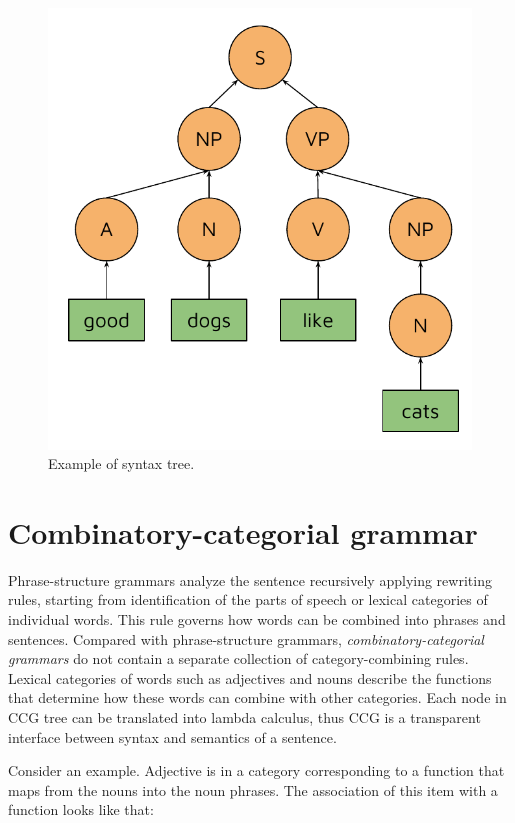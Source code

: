 \begin{figure}
\centering
\includegraphics{Figures/syntaxtree}
\decoRule
\caption[Syntax tree]{Example of syntax tree.}
\label{fig:syntax_tree}
\end{figure}

\section{Combinatory-categorial grammar}
Phrase-structure grammars analyze the sentence recursively applying rewriting rules, starting from identification of the parts of speech or lexical categories of individual words. This rule governs how words can be combined into phrases and sentences. Compared with phrase-structure grammars, \emph{combinatory-categorial grammars} do not contain a separate collection of category-combining rules. Lexical categories of words such as adjectives and nouns describe the functions that determine how these words can combine with other categories. Each node in CCG tree can be translated into lambda calculus, thus CCG is a transparent interface between syntax and semantics of a sentence.

Consider an example. Adjective  is in a category corresponding to a function that maps from the nouns into the noun phrases. The association of this item with a function looks like that:

